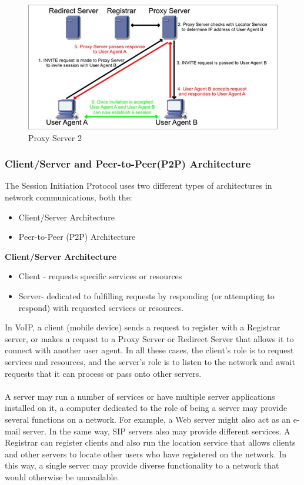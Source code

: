 \documentclass[a4paper]{article}
\begin{document}
\begin{center}
\begin{figure}[H]
\includegraphics[width=1\linewidth]{./pictures/proxy2.JPG}
\caption{\label{fig:Proxy Server2} Proxy Server 2}
\end{figure}
\end{center}

\subsubsection{Client/Server and Peer-to-Peer(P2P) Architecture}
The Session Initiation Protocol uses two different types of architectures in network communications, both the:
\begin{itemize}
\item Client/Server Architecture
\item Peer-to-Peer (P2P) Architecture
\end{itemize}
\textbf{Client/Server Architecture}
\begin{itemize}
\item Client - requests specific services or resources
\item Server- dedicated to fulfilling requests by responding (or attempting to respond) with requested services or resources.
\end{itemize}

In VoIP, a client (mobile device) sends a request to register with a Registrar server, or makes a request to a Proxy Server or Redirect Server that allows it to connect with another user agent. In all these cases, the client’s role is to request services and resources, and the server’s role is to listen to the network and await requests that it can process or pass onto other servers.\\
\\
A server may run a number of services or have multiple server applications installed on it, a computer dedicated to the role of being a server may provide several functions on a network.
For example, a Web server might also act as an e-mail server. In the same way, SIP servers also may provide different services. A Registrar can register clients and also run the location service that allows clients and other servers to locate other users who have registered on the network. In this way, a single server may provide diverse functionality to a network that would otherwise be unavailable.
\end{document}
